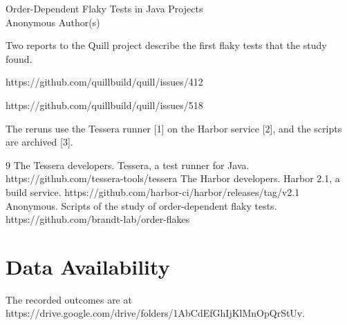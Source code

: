 

\begin{center}
{\Large Order-Dependent Flaky Tests in Java Projects}\\[1ex]
Anonymous Author(s)
\end{center}

\visibleintro

Two reports to the Quill project describe the first flaky tests that the study found.

https://github.com/quillbuild/quill/issues/412

https://github.com/quillbuild/quill/issues/518

The reruns use the Tessera runner [1] on the Harbor service [2], and the scripts are archived [3].

\begin{thebibliography}{9}
 The Tessera developers. Tessera, a test runner for Java.\newline
https://github.com/tessera-tools/tessera
 The Harbor developers. Harbor 2.1, a build service.\newline
https://github.com/harbor-ci/harbor/releases/tag/v2.1
 Anonymous. Scripts of the study of order-dependent flaky tests.\newline
https://github.com/brandt-lab/order-flakes
\end{thebibliography}

\section*{Data Availability}
The recorded outcomes are at https://drive.google.com/drive/folders/1AbCdEfGhIjKlMnOpQrStUv.


